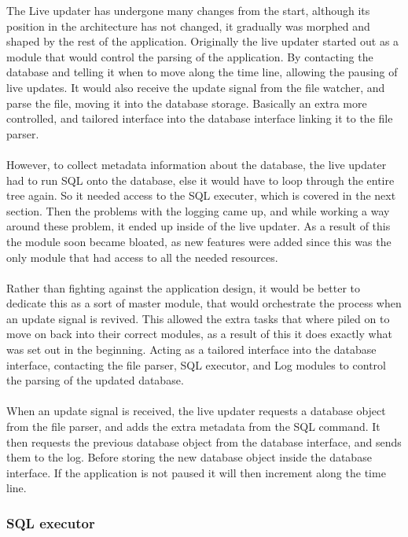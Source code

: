 The Live updater has undergone many changes from the start, although its position in the architecture has not changed, it gradually was morphed and shaped by the rest of the application. Originally the live updater started out as a module that would control the parsing of the application. By contacting the database and telling it when to move along the time line, allowing the pausing of live updates. It would also receive the update signal from the file watcher, and parse the file, moving it into the database storage. Basically an extra more controlled, and tailored interface into the database interface linking it to the file parser.
\\\\
However, to collect metadata information about the database, the live updater had to run SQL onto the database, else it would have to loop through the entire tree again. So it needed access to the SQL executer, which is covered in the next section. Then the problems with the logging came up, and while working a way around these problem, it ended up inside of the live updater. As a result of this the module soon became bloated, as new features were added since this was the only module that had access to all the needed resources.
\\\\
Rather than fighting against the application design, it would be better to dedicate this as a sort of master module, that would orchestrate the process when an update signal is revived. This allowed the extra tasks that where piled on to move on back into their correct modules, as a result of this it does exactly what was set out in the beginning. Acting as a tailored interface into the database interface, contacting the file parser, SQL executor, and Log modules to control the parsing of the updated database.
\\\\
When an update signal is received, the live updater requests a database object from the file parser, and adds the extra metadata from the SQL command. It then requests the previous database object from the database interface, and sends them to the log. Before storing the new database object inside the database interface. If the application is not paused it will then increment along the time line. 

\subsubsection{SQL executor}
\label{subsubsec:sql_executor_imp}

